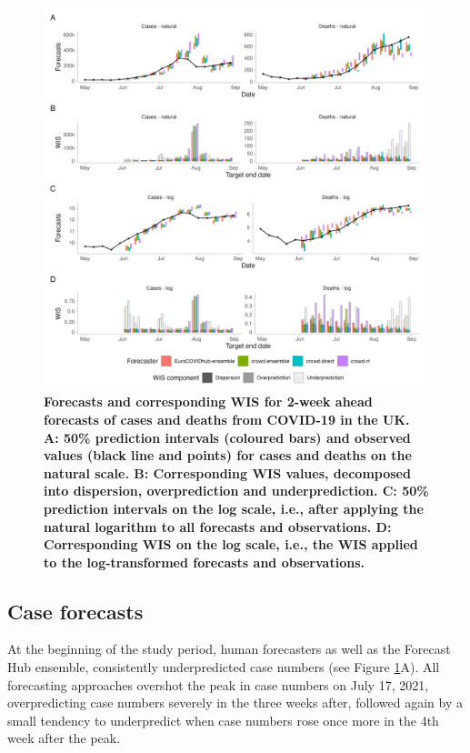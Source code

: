 \documentclass[10pt,a4paper,twocolumn]{article}
\begin{document}
\begin{figure}
\centering
\includegraphics[width=0.99\textwidth]{../output/figures/scores-and-forecasts.png}
\caption{\bf{Forecasts and corresponding WIS for 2-week ahead forecasts of cases and deaths from COVID-19 in the UK.} A: 50\% prediction intervals (coloured bars) and observed values (black line and points) for cases and deaths on the natural scale. B: Corresponding WIS values, decomposed into dispersion, overprediction and underprediction. C: 50\% prediction intervals on the log scale, i.e., after applying the natural logarithm to all forecasts and observations. D: Corresponding WIS on the log scale, i.e., the WIS applied to the log-transformed forecasts and observations.} 
\label{fig:forecasts-scores} 
\end{figure}

\subsection*{Case forecasts}

At the beginning of the study period, human forecasters as well as the Forecast Hub ensemble, consistently underpredicted case numbers (see Figure \ref{fig:forecasts-scores}A). All forecasting approaches overshot the peak in case numbers on July 17, 2021, overpredicting case numbers severely in the three weeks after, followed again by a small tendency to underpredict when case numbers rose once more in the 4th week after the peak.
\end{document}
